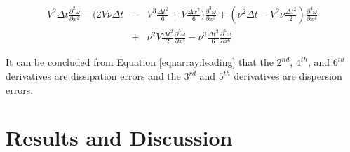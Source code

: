 \documentclass[letterpaper,12pt]{article}
\begin{document}
\begin{eqnarray}
	V^2\Delta t \frac{\partial^2 \omega}{\partial x^2} - (2V\nu\Delta t &-&V^3\frac{\Delta t^2}{6} + V\frac{\Delta x^2}{6})\frac{\partial^3 \omega}{\partial x^3} + (\nu^2\Delta t -V^2\nu\frac{\Delta t^2}{2})\frac{\partial^4 \omega}{\partial x^4} \nonumber \\
	&+& \nu^2V\frac{\Delta t^2}{2}\frac{\partial^5 \omega}{\partial x^5} - \nu^3\frac{\Delta t^2}{6}\frac{\partial^6 \omega}{\partial x^6}
	\label{eqnarray:leading}
\end{eqnarray}

It can be concluded from Equation \ref{eqnarray:leading} that the $2^{nd}$, $4^{th}$, and $6^{th}$ derivatives are dissipation errors
and the $3^{rd}$ and $5^{th}$ derivatives are dispersion errors.

\newpage

\section{Results and Discussion}
\end{document}

